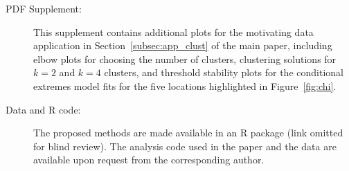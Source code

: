 \documentclass[preprint,12pt,authoryear]{elsarticle}
\begin{document}
\begin{description}

  \item[PDF Supplement:] This supplement contains additional plots for the motivating data application in Section~\ref{subsec:app_clust} of the main paper, including elbow plots for choosing the number of clusters, clustering solutions for $k=2$ and $k=4$ clusters, and threshold stability plots for the conditional extremes model fits for the five locations highlighted in Figure~\ref{fig:chi}.

  \item[Data and R code:] The proposed methods are made available in an R package (link omitted for blind review).
    The analysis code used in the paper and the data are available upon request from the corresponding author.

\end{description}


% 
{\small
% 

}

\clearpage
\end{document}
